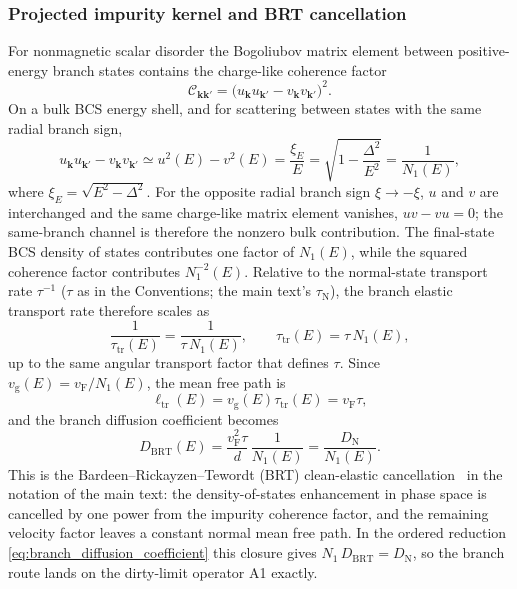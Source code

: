 \documentclass[
  aps,
  prb,
  preprint,
  superscriptaddress,
  longbibliography,
  nofootinbib
]{revtex4-2}
\newcommand{\bk}{\mathbf{k}}
\newcommand{\vF}{v_{\mathrm{F}}}
\newcommand{\vg}{v_{\mathrm{g}}}
\newcommand{\tautr}{\tau_{\mathrm{tr}}}
\newcommand{\elltr}{\ell_{\mathrm{tr}}}
\newcommand{\DOS}{N_1}
\newcommand{\DN}{D_{\mathrm{N}}}
\begin{document}
\subsubsection{Projected impurity kernel and BRT cancellation}

For nonmagnetic scalar disorder the Bogoliubov matrix element between
positive-energy branch states contains the charge-like coherence factor
\begin{equation}
  \mathcal C_{\bk\bk'}
  =
  \bigl(u_{\bk}u_{\bk'}-v_{\bk}v_{\bk'}\bigr)^2 .
  \label{eq:branch_coherence_factor}
\end{equation}
On a bulk BCS energy shell, and for scattering between states with the same
radial branch sign,
\begin{equation}
  u_{\bk}u_{\bk'}-v_{\bk}v_{\bk'}
  \simeq
  u^2(E)-v^2(E)
  =
  \frac{\xi_E}{E}
  =
  \sqrt{1-\frac{\Delta^2}{E^2}}
  =
  \frac{1}{\DOS(E)} ,
  \label{eq:branch_coherence_on_shell}
\end{equation}
where \(\xi_E=\sqrt{E^2-\Delta^2}\). For the opposite radial branch sign
\(\xi\to-\xi\), \(u\) and \(v\) are interchanged and the same charge-like matrix
element vanishes, \(uv-vu=0\); the same-branch channel is therefore the
nonzero bulk contribution. The final-state BCS density of states contributes
one factor of \(\DOS(E)\), while the squared coherence factor contributes
\(\DOS^{-2}(E)\). Relative to the normal-state transport rate
\(\tau^{-1}\) (\(\tau\) as in the Conventions; the main text's
\(\tau_{\mathrm N}\)),
the branch elastic transport rate therefore scales as
\begin{equation}
  \frac{1}{\tautr(E)}
  =
  \frac{1}{\tau\,\DOS(E)},
  \qquad
  \tautr(E)=\tau\,\DOS(E),
  \label{eq:branch_brt_time}
\end{equation}
up to the same angular transport factor that defines \(\tau\). Since
\(\vg(E)=\vF/\DOS(E)\), the mean free path is
\begin{equation}
  \elltr(E)=\vg(E)\tautr(E)=\vF\tau,
  \label{eq:branch_constant_ell}
\end{equation}
and the branch diffusion coefficient becomes
\begin{equation}
  D_{\mathrm{BRT}}(E)
  =
  \frac{\vF^2\tau}{d}\,\frac{1}{\DOS(E)}
  =
  \frac{\DN}{\DOS(E)} .
  \label{eq:branch_brt_diffusion}
\end{equation}
This is the Bardeen--Rickayzen--Tewordt (BRT) clean-elastic
cancellation~\cite{bardeen1959} in the
notation of the main text: the density-of-states enhancement in phase space
is cancelled by one power from the impurity coherence factor, and the remaining
velocity factor leaves a constant normal mean free path. In the ordered
reduction \cref{eq:branch_diffusion_coefficient} this closure gives
\(\DOS\,D_{\mathrm{BRT}}=\DN\), so the branch route lands on the
dirty-limit operator A1 exactly.
\end{document}
